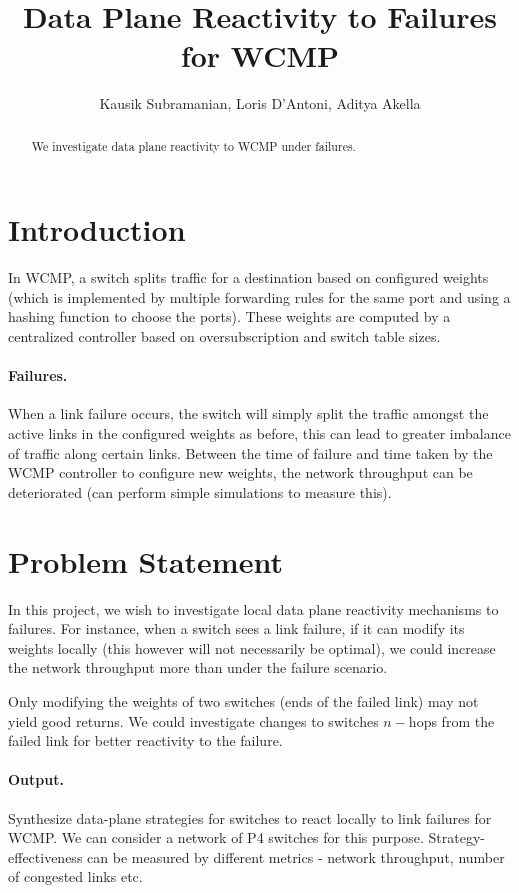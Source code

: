 \documentclass[]{article}
\title{Data Plane Reactivity to Failures for WCMP}
\author{Kausik Subramanian, Loris D'Antoni, Aditya Akella}
\begin{document}
\maketitle

\begin{abstract}
We investigate data plane reactivity to WCMP under failures.
\end{abstract}

\section{Introduction}
In WCMP, a switch splits traffic for a destination based on 
configured weights (which is implemented by multiple 
forwarding rules for the same port and using a hashing function
to choose the ports). 
These weights are computed by a centralized controller based
on oversubscription and switch table sizes.

\paragraph{Failures.} When a link failure occurs,
the switch will simply split the traffic amongst the 
active links in the configured weights as before, this
can lead to greater imbalance of traffic along certain 
links. Between the time of failure and time taken by 
the WCMP controller to configure new weights, the 
network throughput can be deteriorated (can perform simple
simulations to measure this).

\section{Problem Statement}
In this project, we wish to investigate local data plane
reactivity mechanisms to failures. For instance, when a 
switch sees a link failure, if it can modify its weights 
locally (this however will not necessarily be optimal), we
could increase the network throughput more than under the 
failure scenario. 

Only modifying the weights of two switches (ends of the failed link)
may not yield good returns. We could investigate changes to switches
$n-$hops from the failed link for better reactivity to the failure. 

\paragraph{Output.} Synthesize data-plane strategies
for switches to react locally to link failures for WCMP. We can 
consider a network of P4 switches for this purpose. Strategy-effectiveness
 can be measured by different metrics - network throughput, number of 
 congested links etc. 
\end{document}

